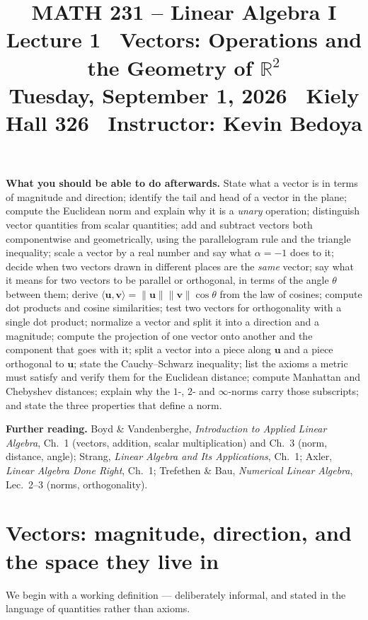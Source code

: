 \documentclass[11pt]{article}
\title{\vspace{-1.2cm}\textbf{\sffamily MATH 231 -- Linear Algebra I}\\[4pt]
       {\large\sffamily Lecture 1 \textbullet\ Vectors: Operations and the
        Geometry of $\mathbb{R}^{2}$}\\[2pt]
       {\normalsize\sffamily Tuesday, September 1, 2026 \textbullet\
        Kiely Hall 326 \textbullet\ Instructor: Kevin Bedoya}}
\author{}
\date{}
\theoremstyle{definition}
\theoremstyle{remark}
\newcommand{\vc}[1]{\mathbf{#1}}
\newcommand{\norm}[1]{\lVert #1\rVert}
\begin{document}
\maketitle
\vspace{-1.6cm}

\noindent\textbf{What you should be able to do afterwards.} State what a vector
is in terms of magnitude and direction; identify the tail and head of a vector
in the plane; compute the Euclidean norm and explain why it is a \emph{unary}
operation; distinguish vector quantities from scalar quantities; add and
subtract vectors both componentwise and geometrically, using the parallelogram
rule and the triangle inequality; scale a vector by a real number and say what
$\alpha=-1$ does to it; decide when two vectors drawn in different places are
the \emph{same} vector; say what it means for two vectors to be parallel or
orthogonal, in terms of the angle $\theta$ between them; derive
$\langle\vc{u},\vc{v}\rangle=\norm{\vc{u}}\norm{\vc{v}}\cos\theta$ from the law
of cosines; compute dot products and cosine similarities; test two vectors for
orthogonality with a single dot product; normalize a vector and split it into a
direction and a magnitude; compute the projection of one vector onto another and
the component that goes with it; split a vector into a piece along $\vc{u}$ and
a piece orthogonal to $\vc{u}$; state the Cauchy--Schwarz inequality; list the
axioms a metric must satisfy and verify them for the Euclidean distance; compute
Manhattan and Chebyshev distances; explain why the $1$-, $2$- and $\infty$-norms
carry those subscripts; and state the three properties that define a norm.

\medskip
\noindent\textbf{Further reading.}
Boyd \& Vandenberghe, \emph{Introduction to Applied Linear Algebra}, Ch.~1
(vectors, addition, scalar multiplication) and Ch.~3 (norm, distance, angle);
Strang, \emph{Linear Algebra and Its Applications}, Ch.~1;
Axler, \emph{Linear Algebra Done Right}, Ch.~1;
Trefethen \& Bau, \emph{Numerical Linear Algebra}, Lec.~2--3 (norms,
orthogonality).

\section{Vectors: magnitude, direction, and the space they live in}
We begin with a working definition --- deliberately informal, and stated in the
language of quantities rather than axioms.
\end{document}
